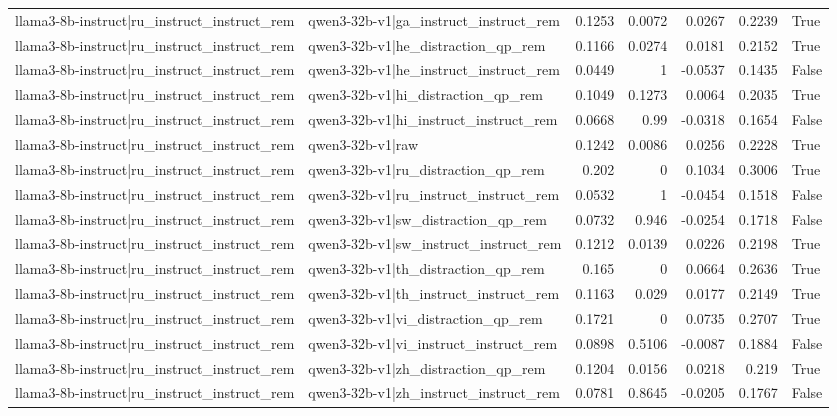 \begin{table}
\begin{tabular}{l l r r r r l}
llama3-8b-instruct|ru_instruct_instruct_rem & qwen3-32b-v1|ga_instruct_instruct_rem & 0.1253 & 0.0072 & 0.0267 & 0.2239 & True \\
llama3-8b-instruct|ru_instruct_instruct_rem & qwen3-32b-v1|he_distraction_qp_rem & 0.1166 & 0.0274 & 0.0181 & 0.2152 & True \\
llama3-8b-instruct|ru_instruct_instruct_rem & qwen3-32b-v1|he_instruct_instruct_rem & 0.0449 & 1 & -0.0537 & 0.1435 & False \\
llama3-8b-instruct|ru_instruct_instruct_rem & qwen3-32b-v1|hi_distraction_qp_rem & 0.1049 & 0.1273 & 0.0064 & 0.2035 & True \\
llama3-8b-instruct|ru_instruct_instruct_rem & qwen3-32b-v1|hi_instruct_instruct_rem & 0.0668 & 0.99 & -0.0318 & 0.1654 & False \\
llama3-8b-instruct|ru_instruct_instruct_rem & qwen3-32b-v1|raw & 0.1242 & 0.0086 & 0.0256 & 0.2228 & True \\
llama3-8b-instruct|ru_instruct_instruct_rem & qwen3-32b-v1|ru_distraction_qp_rem & 0.202 & 0 & 0.1034 & 0.3006 & True \\
llama3-8b-instruct|ru_instruct_instruct_rem & qwen3-32b-v1|ru_instruct_instruct_rem & 0.0532 & 1 & -0.0454 & 0.1518 & False \\
llama3-8b-instruct|ru_instruct_instruct_rem & qwen3-32b-v1|sw_distraction_qp_rem & 0.0732 & 0.946 & -0.0254 & 0.1718 & False \\
llama3-8b-instruct|ru_instruct_instruct_rem & qwen3-32b-v1|sw_instruct_instruct_rem & 0.1212 & 0.0139 & 0.0226 & 0.2198 & True \\
llama3-8b-instruct|ru_instruct_instruct_rem & qwen3-32b-v1|th_distraction_qp_rem & 0.165 & 0 & 0.0664 & 0.2636 & True \\
llama3-8b-instruct|ru_instruct_instruct_rem & qwen3-32b-v1|th_instruct_instruct_rem & 0.1163 & 0.029 & 0.0177 & 0.2149 & True \\
llama3-8b-instruct|ru_instruct_instruct_rem & qwen3-32b-v1|vi_distraction_qp_rem & 0.1721 & 0 & 0.0735 & 0.2707 & True \\
llama3-8b-instruct|ru_instruct_instruct_rem & qwen3-32b-v1|vi_instruct_instruct_rem & 0.0898 & 0.5106 & -0.0087 & 0.1884 & False \\
llama3-8b-instruct|ru_instruct_instruct_rem & qwen3-32b-v1|zh_distraction_qp_rem & 0.1204 & 0.0156 & 0.0218 & 0.219 & True \\
llama3-8b-instruct|ru_instruct_instruct_rem & qwen3-32b-v1|zh_instruct_instruct_rem & 0.0781 & 0.8645 & -0.0205 & 0.1767 & False \\

\end{tabular}
\end{table}
